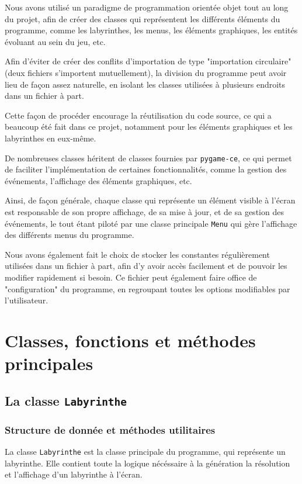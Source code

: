 \documentclass[12pt]{scrreprt} %
\begin{document}
Nous avons utilisé un paradigme de programmation orientée objet tout au long du projet, afin de créer des classes qui représentent les différents éléments du programme, comme les labyrinthes, les menus, les éléments graphiques, les entités évoluant au sein du jeu, etc.

Afin d'éviter de créer des conflits d'importation de type "importation circulaire" (deux fichiers s'importent mutuellement), la division du programme peut avoir lieu de façon assez naturelle, en isolant les classes utilisées à plusieurs endroits dans un fichier à part.

Cette façon de procéder encourage la réutilisation du code source, ce qui a beaucoup été fait dans ce projet, notamment pour les éléments graphiques et les labyrinthes en eux-même.

De nombreuses classes héritent de classes fournies par \texttt{pygame-ce}, ce qui permet de faciliter l'implémentation de certaines fonctionnalités, comme la gestion des événements, l'affichage des éléments graphiques, etc.

Ainsi, de façon générale, chaque classe qui représente un élément visible à l'écran est responsable de son propre affichage, de sa mise à jour, et de sa gestion des événements, le tout étant piloté par une classe principale \texttt{Menu} qui gère l'affichage des différents menus du programme.

Nous avons également fait le choix de stocker les constantes régulièrement utilisées dans un fichier à part, afin d'y avoir accès facilement et de pouvoir les modifier rapidement si besoin. Ce fichier peut également faire office de "configuration" du programme, en regroupant toutes les options modifiables par l'utilisateur.

\section{Classes, fonctions et méthodes principales}

\subsection{La classe \texttt{Labyrinthe}}

\subsubsection{Structure de donnée et méthodes utilitaires}

La classe \texttt{Labyrinthe} est la classe principale du programme, qui représente un labyrinthe. Elle contient toute la logique nécéssaire à la génération la résolution et l'affichage d'un labyrinthe à l'écran.
\end{document}
